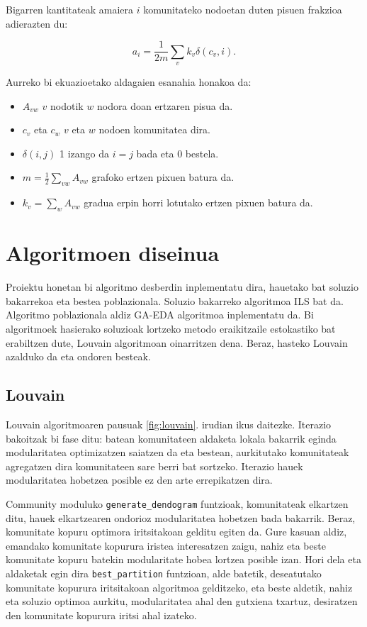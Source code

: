 \documentclass[sigconf]{acmart}
\begin{document}
Bigarren kantitateak amaiera $i$ komunitateko nodoetan duten pisuen frakzioa adierazten du:

\begin{equation}
a_i=\frac{1}{2m}\sum_{v}k_v\delta(c_v,i).
\end{equation}

Aurreko bi ekuazioetako aldagaien esanahia honakoa da:
\begin{itemize}
    \item $A_{vw}$ $v$ nodotik $w$ nodora doan ertzaren pisua da.
    \item $c_v$ eta $c_w$ $v$ eta $w$ nodoen komunitatea dira.
    \item $\delta(i, j)$ 1 izango da $i = j$ bada eta 0 bestela.
    \item $m = \frac{1}{2}\sum_{vw}A_{vw}$ grafoko ertzen pixuen batura da.
    \item $k_v = \sum_{w}A_{vw}$ gradua erpin horri lotutako ertzen pixuen batura da.
\end{itemize}


\section{Algoritmoen diseinua}

Proiektu honetan bi algoritmo desberdin inplementatu dira, hauetako bat soluzio bakarrekoa eta bestea poblazionala.
Soluzio bakarreko algoritmoa ILS bat da. Algoritmo poblazionala aldiz GA-EDA algoritmoa inplementatu da. Bi algoritmoek hasierako soluzioak lortzeko metodo eraikitzaile estokastiko bat erabiltzen dute, Louvain algoritmoan oinarritzen dena. Beraz, hasteko Louvain azalduko da eta ondoren besteak.

\subsection{Louvain}
Louvain algoritmoaren \cite{blondel2008fast} pausuak \ref{fig:louvain}. irudian ikus daitezke. Iterazio bakoitzak bi fase ditu: batean komunitateen aldaketa lokala bakarrik eginda modularitatea optimizatzen saiatzen da eta bestean, aurkitutako komunitateak agregatzen dira komunitateen sare berri bat sortzeko. Iterazio hauek modularitatea hobetzea posible ez den arte errepikatzen dira.

Community moduluko \texttt{generate\_dendogram} funtzioak, komunitateak elkartzen ditu, hauek elkartzearen ondorioz modularitatea hobetzen bada bakarrik. Beraz, komunitate kopuru optimora iritsitakoan gelditu egiten da. Gure kasuan aldiz, emandako komunitate kopurura iristea interesatzen zaigu, nahiz eta beste komunitate kopuru batekin modularitate hobea lortzea posible izan. Hori dela eta aldaketak egin dira \texttt{best\_partition} funtzioan, alde batetik, deseatutako komunitate kopurura iritsitakoan algoritmoa gelditzeko, eta beste aldetik, nahiz eta soluzio optimoa aurkitu, modularitatea ahal den gutxiena txartuz, desiratzen den komunitate kopurura iritsi ahal izateko.
\end{document}
